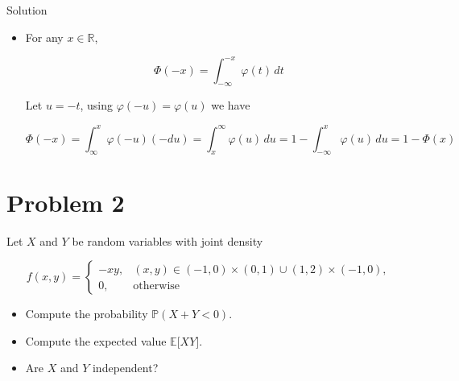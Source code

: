 \begin{qlsolution}{Solution}
\begin{itemize}
  Since \(\int_{- \infty}^{\infty}\mathit{\varphi}(\mathit{x})\,\mathit{d}\mathit{x} = 1\), the two equal halves are each \(1/2\), so \(\Phi(0) = 1/2\).
\item
  For any \(\mathit{x} \in \mathbb{R}\),

  \[\Phi( - \mathit{x}) = \int_{- \infty}^{- \mathit{x}}\mathit{\varphi}(\mathit{t})\,\mathit{d}\mathit{t}\]

  Let \(\mathit{u} = - \mathit{t}\), using \(\mathit{\varphi}( - \mathit{u}) = \mathit{\varphi}(\mathit{u})\) we have

  \[\Phi( - \mathit{x}) = \int_{\infty}^{\mathit{x}}\mathit{\varphi}( - \mathit{u})( - \mathit{d}\mathit{u}) = \int_{\mathit{x}}^{\infty}\mathit{\varphi}(\mathit{u})\,\mathit{d}\mathit{u} = 1 - \int_{- \infty}^{\mathit{x}}\mathit{\varphi}(\mathit{u})\,\mathit{d}\mathit{u} = 1 - \Phi(\mathit{x})\]
\end{itemize}

\end{qlsolution}

\section{Problem 2}\label{hw03-problem-2}

Let \(\mathit{X}\) and \(\mathit{Y}\) be random variables with joint density

\[\mathit{f}(\mathit{x},\mathit{y}) = \left\{ \begin{matrix}
{- \mathit{x}\mathit{y},} & {(\mathit{x},\mathit{y}) \in ( - 1,0) \times (0,1) \cup (1,2) \times ( - 1,0),} \\
{0,} & \text{otherwise}
\end{matrix} \right.\]

\begin{itemize}
\item
  Compute the probability \(\mathbb{P}(\mathit{X} + \mathit{Y} < 0)\).
\item
  Compute the expected value \(\mathbb{E}\lbrack\mathit{X}\mathit{Y}\rbrack\).
\item
  Are \(\mathit{X}\) and \(\mathit{Y}\) independent?
\end{itemize}

